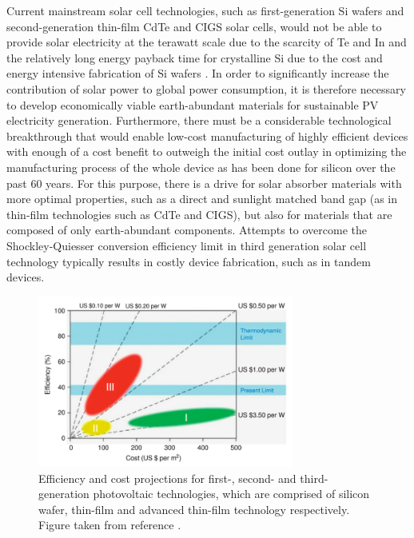 Current mainstream solar cell technologies, such as first-generation Si wafers and second-generation thin-film CdTe and CIGS solar cells, would not be able to provide solar electricity at the terawatt scale due to the scarcity of Te and In and the relatively long energy payback time for crystalline Si due to the cost and energy intensive fabrication of Si wafers \cite{CZTS_vs_MAPI}. In order to significantly increase the contribution of solar power to global power consumption, it is therefore necessary to develop economically viable earth-abundant materials for sustainable PV electricity generation. Furthermore, there must be a considerable technological breakthrough that would enable low-cost manufacturing of highly efficient devices with enough of a cost benefit to outweigh the initial cost outlay in optimizing the manufacturing process of the whole device as has been done for silicon over the past 60 years. For this purpose, there is a drive for solar absorber materials with more optimal properties, such as a direct and sunlight matched band gap (as in thin-film technologies such as CdTe and CIGS), but also for materials that are composed of only earth-abundant components. Attempts to overcome the Shockley-Quiesser conversion efficiency limit in third generation solar cell technology typically results in costly device fabrication, such as in tandem devices. 


\begin{figure}[h!]
  \centering
    \includegraphics[width=0.75\textwidth]{figures/PV_generations.png}
    \caption{Efficiency and cost projections for first-, second- and third-generation photovoltaic technologies, which are comprised of silicon wafer, thin-film and advanced thin-film technology respectively. Figure 
 taken from reference .}
  \label{PV_generations}
\end{figure}


